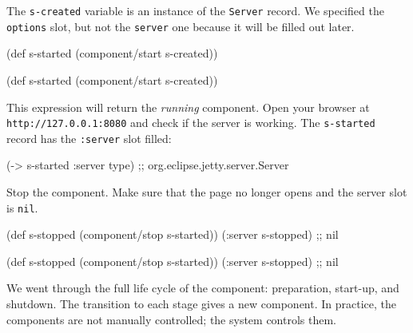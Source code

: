 \fi

The \verb|s-created| variable is an instance of the \verb|Server| record. We specified the \verb|options| slot, but not the \verb|server| one because it will be filled out later.

\ifnarrow

\begin{english}
  \begin{clojure}
(def s-started
  (component/start s-created))
  \end{clojure}
\end{english}

\else

\begin{english}
  \begin{clojure}
(def s-started (component/start s-created))
  \end{clojure}
\end{english}

\fi


This expression will return the \emph{running} component. Open your browser at \texttt{http://127.0.0.1\-:8080} and check if the server is working. The \verb|s-started| record has the \verb|:server| slot filled:

\begin{english}
  \begin{clojure}
(-> s-started :server type)
;; org.eclipse.jetty.server.Server
  \end{clojure}
\end{english}

Stop the component. Make sure that the page no longer opens and the server slot is \verb|nil|.

\ifnarrow

\begin{english}
  \begin{clojure}
(def s-stopped
  (component/stop s-started))
(:server s-stopped) ;; nil
  \end{clojure}
\end{english}

\else

\begin{english}
  \begin{clojure}
(def s-stopped (component/stop s-started))
(:server s-stopped) ;; nil
  \end{clojure}
\end{english}

\fi

We went through the full life cycle of the component: preparation, start-up, and shutdown. The transition to each stage gives a new component. In practice, the components are not manually controlled; the system controls them.

